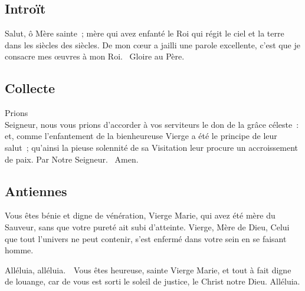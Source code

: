 


\begin{multicols}{2}
\subsection*{Introït}
{Salut, ô Mère sainte~; mère qui avez enfanté le Roi qui régit le ciel et la terre dans les siècles des siècles.}
De mon cœur a jailli une parole excellente, c’est que je consacre mes œuvres à mon Roi. \vb\ Gloire au Père.

\subsection*{Collecte}
{Prions\\
Seigneur, nous vous prions d’accorder à vos serviteurs le don de la grâce céleste~: et, comme l’enfantement de la bienheureuse Vierge a été le principe de leur salut~; qu’ainsi la pieuse solennité de sa Visitation leur procure un accroissement de paix. Par Notre Seigneur.}
{\textbf \rb\ Amen.}

\subsection*{Antiennes}
Vous êtes bénie et digne de vénération, Vierge Marie, qui avez été mère du Sauveur, sans que votre pureté ait subi d’atteinte. Vierge, Mère de Dieu, Celui que tout l’univers ne peut contenir, s’est enfermé dans votre sein en se faisant homme.

Alléluia, alléluia. \vb\ Vous êtes heureuse, sainte Vierge Marie, et tout à fait digne de louange, car de vous est sorti le soleil de justice, le Christ notre Dieu. Alléluia.


\end{multicols}
